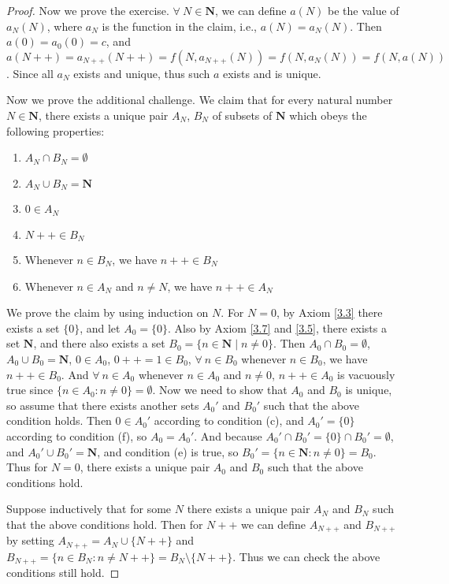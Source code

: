 \begin{proof}
    Now we prove the exercise.
    \(\forall\ N \in \mathbf{N}\), we can define \(a(N)\) be the value of \(a_N(N)\), where \(a_N\) is the function in the claim, i.e., \(a(N) = a_{N}(N)\).
    Then \(a(0) = a_0(0) = c\), and \(a(N++) = a_{N++}(N++) = f(N, a_{N++}(N)) = f(N, a_{N}(N)) = f(N, a(N))\).
    Since all \(a_N\) exists and unique, thus such \(a\) exists and is unique.

    Now we prove the additional challenge.
    We claim that for every natural number \(N \in \mathbf{N}\), there exists a unique pair \(A_N\), \(B_N\) of subsets of \(\mathbf{N}\) which obeys the following properties:
    \begin{enumerate}
        \item \(A_N \cap B_N = \emptyset\)
        \item \(A_N \cup B_N = \mathbf{N}\)
        \item \(0 \in A_N\)
        \item \(N++ \in B_N\)
        \item Whenever \(n \in B_N\), we have \(n++ \in B_N\)
        \item Whenever \(n \in A_N\) and \(n \neq N\), we have \(n++ \in A_N\)
    \end{enumerate}

    We prove the claim by using induction on \(N\).
    For \(N = 0\), by Axiom \ref{3.3} there exists a set \(\{0\}\), and let \(A_0 = \{0\}\).
    Also by Axiom \ref{3.7} and \ref{3.5}, there exists a set \(\mathbf{N}\), and there also exists a set \(B_0 = \{n \in \mathbf{N} \mid n \neq 0\}\).
    Then \(A_0 \cap B_0 = \emptyset\), \(A_0 \cup B_0 = \mathbf{N}\), \(0 \in A_0\), \(0++ = 1 \in B_0\), \(\forall\ n \in B_0\) whenever \(n \in B_0\), we have \(n++ \in B_0\).
    And \(\forall\ n \in A_0\) whenever \(n \in A_0\) and \(n \neq 0\), \(n++ \in A_0\) is vacuously true since \(\{n \in A_0 : n \neq 0\} = \emptyset\).
    Now we need to show that \(A_0\) and \(B_0\) is unique, so assume that there exists another sets \(A_0'\) and \(B_0'\) such that the above condition holds.
    Then \(0 \in A_0'\) according to condition (c), and \(A_0' = \{0\}\) according to condition (f), so \(A_0 = A_0'\).
    And because \(A_0' \cap B_0' = \{0\} \cap B_0' = \emptyset\), and \(A_0' \cup B_0' = \mathbf{N}\), and condition (e) is true, so \(B_0' = \{n \in \mathbf{N} : n \neq 0\} = B_0\).
    Thus for \(N = 0\), there exists a unique pair \(A_0\) and \(B_0\) such that the above conditions hold.

    Suppose inductively that for some \(N\) there exists a unique pair \(A_N\) and \(B_N\) such that the above conditions hold.
    Then for \(N++\) we can define \(A_{N++}\) and \(B_{N++}\) by setting \(A_{N++} = A_N \cup \{N++\}\) and \(B_{N++} = \{n \in B_N : n \neq N++\} = B_N \setminus \{N++\}\).
    Thus we can check the above conditions still hold.


\end{proof}
